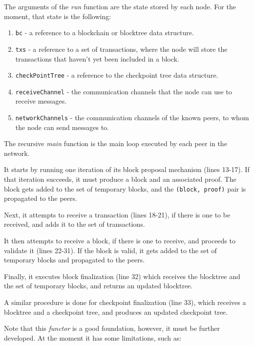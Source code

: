 The arguments of the \textit{run} function are the state stored by each node. For the moment, that state is the following:

\begin{enumerate}
  \item \texttt{bc} - a reference to a blockchain or blocktree data structure.
  \item \texttt{txs} - a reference to a set of transactions, where the node will store the transactions that haven't yet been included in a block.
  \item \texttt{checkPointTree} - a reference to the checkpoint tree data structure.
  \item \texttt{receiveChannel} - the communication channels that the node can use to receive messages.
  \item \texttt{networkChannels} - the communication channels of the known peers, to whom the node can send messages to.
\end{enumerate}

The recursive \textit{main} function is the main loop executed by each peer in the network.

It starts by running one iteration of its block proposal mechanism (lines 13-17). If that iteration succeeds, it must produce a block and an associated proof. The block gets added to the set of temporary blocks, and the \texttt{(block, proof)} pair is propagated to the peers.

Next, it attempts to receive a transaction (lines 18-21), if there is one to be received, and adds it to the set of transactions.

It then attempts to receive a block, if there is one to receive, and proceeds to validate it (lines 22-31). If the block is valid, it gets added to the set of temporary blocks and propagated to the peers.

Finally, it executes block finalization (line 32) which receives the blocktree and the set of temporary blocks, and returns an updated blocktree.

A similar procedure is done for checkpoint finalization (line 33), which receives a blocktree and a checkpoint tree, and produces an updated checkpoint tree.

\vspace{0.75cm}

Note that this \textit{functor} is a good foundation, however, it must be further developed. At the moment it has some limitations, such as:

